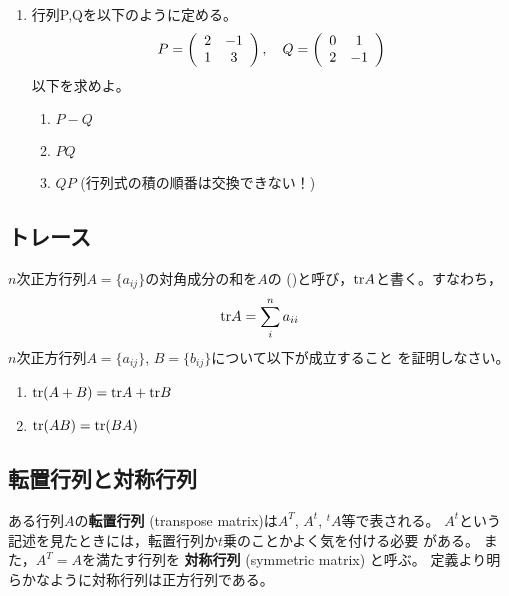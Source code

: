 \documentclass[twocolumn,11pt]{jarticle}
\begin{document}
\begin{enumerate}
\item 
行列P,Qを以下のように定める。
\begin{align}
  P=\left(
  \begin{array}{cc}
    2 & -1 \\
    1 & 3
  \end{array}\right),\quad
  Q=\left(
  \begin{array}{cc}
    0 & 1 \\
    2 & -1
  \end{array}\right)\notag
\end{align}
以下を求めよ。
\begin{enumerate}
\item $P-Q$
\item $P Q$
\item $Q P$ (行列式の積の順番は交換できない！)
\end{enumerate}
\end{enumerate}

\subsection{トレース}

$n$次正方行列$A=\{a_{ij}\}$の対角成分の和を$A$の
()と呼び，$\mbox{tr} A$と書く。すなわち，
\begin{align}
  \mbox{tr} A=\sum_i^na_{ii}\notag
\end{align}
\question
$n$次正方行列$A=\{a_{ij}\}$, $B=\{b_{ij}\}$について以下が成立すること
を証明しなさい。
\begin{enumerate}
\item $\mbox{tr}(A+B)=\mbox{tr} A+\mbox{tr} B$
\item $\mbox{tr}(AB)=\mbox{tr} (BA)$
\end{enumerate}%

\subsection{転置行列と対称行列}

ある行列$A$の\textbf{転置行列}
(transpose matrix)は$A^T$, $A^t$,
${}^tA$等で表される。
$A^t$という記述を見たときには，転置行列か$t$乗のことかよく気を付ける必要
がある。
また，$A^T=A$を満たす行列を
\textbf{対称行列}
(symmetric matrix)
と呼ぶ。
定義より明らかなように対称行列は正方行列である。
\end{document}
